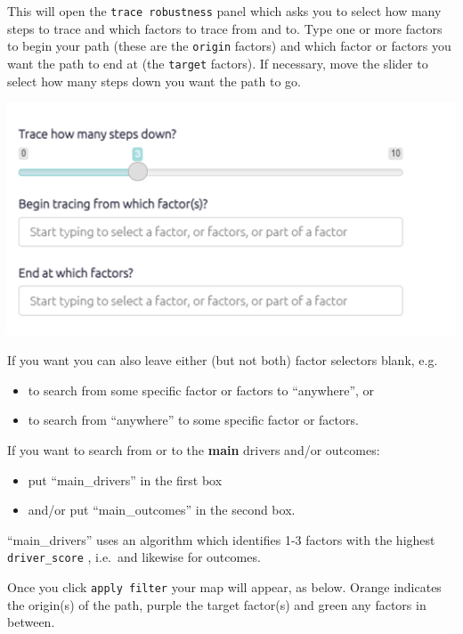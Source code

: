 \documentclass[
]{book}
\providecommand{\tightlist}{%
  \setlength{\itemsep}{0pt}\setlength{\parskip}{0pt}}
\begin{document}
This will open the \texttt{trace\ robustness} panel which asks you to select how many steps to trace and which factors to trace from and to. Type one or more factors to begin your path (these are the \texttt{origin} factors) and which factor or factors you want the path to end at (the \texttt{target} factors). If necessary, move the slider to select how many steps down you want the path to go.

\includegraphics[width=6.77083in,height=\textheight]{_assets/image-20211025151626916.png}

If you want you can also leave either (but not both) factor selectors blank, e.g.

\begin{itemize}
\tightlist
\item
  to search from some specific factor or factors to ``anywhere'', or
\item
  to search from ``anywhere'' to some specific factor or factors.
\end{itemize}

If you want to search from or to the \textbf{main} drivers and/or outcomes:

\begin{itemize}
\tightlist
\item
  put ``main\_drivers'' in the first box
\item
  and/or put ``main\_outcomes'' in the second box.
\end{itemize}

``main\_drivers'' uses an algorithm which identifies 1-3 factors with the highest \texttt{driver\_score} , i.e.~and likewise for outcomes.

Once you click \texttt{apply\ filter} your map will appear, as below. Orange indicates the origin(s) of the path, purple the target factor(s) and green any factors in between.
\end{document}
